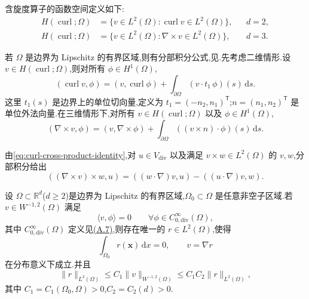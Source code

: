 \begin{note}[含旋度算子的空间与分部积分]\label{note:curl-spaces-integration-by-parts}
含旋度算子的函数空间定义如下:
\[
\begin{aligned}
  H(\operatorname{curl};\Omega)
    &=\{v\in L^2(\Omega):
           \operatorname{curl}v\in L^2(\Omega)\},
       &&d=2,\\
  H(\operatorname{curl};\Omega)
    &=\{v\in L^2(\Omega):
           \nabla\times v\in L^2(\Omega)\},
       &&d=3.
\end{aligned}
\]

若 $\Omega$ 是边界为 Lipschitz 的有界区域,则有分部积分公式,见\textcite[第 34 页]{GiraultRaviart1986}.先考虑二维情形.设 $v\in H(\operatorname{curl};\Omega)$,则对所有 $\phi\in H^1(\Omega)$,
\begin{equation}\label{eq:curl-integration-by-parts-2d}
  (\operatorname{curl}v,\phi)
    =(v,\operatorname{curl}\phi)
      +\int_{\partial\Omega}
          (v\cdot t_1\,\phi)(s)\,\mathrm{d}s.
\end{equation}
这里 $t_1(s)$ 是边界上的单位切向量,定义为 $t_1=(-n_2,n_1)^\mathsf{T}$;$n=(n_1,n_2)^\mathsf{T}$ 是单位外法向量.在三维情形下,对所有 $v\in H(\operatorname{curl};\Omega)$ 以及 $\phi\in H^1(\Omega)$,
\begin{equation}\label{eq:curl-integration-by-parts-3d}
  (\nabla\times v,\phi)
    =(v,\nabla\times\phi)
      +\int_{\partial\Omega}
          ((v\times n)\cdot\phi)(s)\,\mathrm{d}s.
\end{equation}

由\cref{eq:curl-cross-product-identity},对 $u\in V_{\mathrm{div}}$ 以及满足 $v\times w\in L^2(\Omega)$ 的 $v,w$,分部积分给出
\[
  ((\nabla\times v)\times w,u)
    =((w\cdot\nabla)v,u)-((u\cdot\nabla)v,w).
\]
\end{note}

\begin{lemma}\label{lem:distribution-gradient-criterion}
设 $\Omega\subset\mathbb{R}^d$($d\ge2$)是边界为 Lipschitz 的有界区域,$\Omega_0\subset\Omega$ 是任意非空子区域.若 $v\in W^{-1,2}(\Omega)$ 满足
\[
  \langle v,\phi\rangle=0
  \qquad\forall\phi\in C_{0,\mathrm{div}}^\infty(\Omega),
\]
其中 $C_{0,\mathrm{div}}^\infty(\Omega)$ 定义见\hyperref[eq:appendix-a-7]{(A.7)},则存在唯一的 $r\in L^2(\Omega)$,使得
\[
  \int_{\Omega_0}r(\bm{x})\,\mathrm{d}x=0,
  \qquad v=\nabla r
\]
在分布意义下成立.并且
\[
  \|r\|_{L^2(\Omega)}
    \le C_1\|v\|_{W^{-1,2}(\Omega)}
    \le C_1C_2\|r\|_{L^2(\Omega)},
\]
其中 $C_1=C_1(\Omega_0,\Omega)>0$,$C_2=C_2(d)>0$.
\end{lemma}

